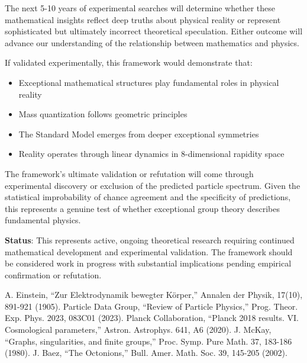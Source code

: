 \documentclass[12pt,a4paper]{article}
\begin{document}
The next 5-10 years of experimental searches will determine whether these mathematical insights reflect deep truths about physical reality or represent sophisticated but ultimately incorrect theoretical speculation. Either outcome will advance our understanding of the relationship between mathematics and physics.

If validated experimentally, this framework would demonstrate that:
\begin{itemize}
\item Exceptional mathematical structures play fundamental roles in physical reality
\item Mass quantization follows geometric principles  
\item The Standard Model emerges from deeper exceptional symmetries
\item Reality operates through linear dynamics in 8-dimensional rapidity space
\end{itemize}

The framework's ultimate validation or refutation will come through experimental discovery or exclusion of the predicted particle spectrum. Given the statistical improbability of chance agreement and the specificity of predictions, this represents a genuine test of whether exceptional group theory describes fundamental physics.

\textbf{Status}: This represents active, ongoing theoretical research requiring continued mathematical development and experimental validation. The framework should be considered work in progress with substantial implications pending empirical confirmation or refutation.

\begin{thebibliography}{99}
 A. Einstein, ``Zur Elektrodynamik bewegter Körper,'' Annalen der Physik, 17(10), 891-921 (1905).
 Particle Data Group, ``Review of Particle Physics,'' Prog. Theor. Exp. Phys. 2023, 083C01 (2023).
 Planck Collaboration, ``Planck 2018 results. VI. Cosmological parameters,'' Astron. Astrophys. 641, A6 (2020).
 J. McKay, ``Graphs, singularities, and finite groups,'' Proc. Symp. Pure Math. 37, 183-186 (1980).
 J. Baez, ``The Octonions,'' Bull. Amer. Math. Soc. 39, 145-205 (2002).
\end{thebibliography}
\end{document}
